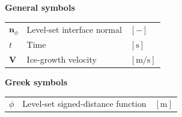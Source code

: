 \documentclass[letterpaper,times]{sae}
\begin{document}
\textbf{General symbols}

\begin{table}[h]
\centering
\begin{tabular}{L{0.08\textwidth} L{0.29\textwidth} L{0.08\textwidth}}
$\boldsymbol{n}_{\phi}$ & Level-set interface normal & $[-]$ \\
$t$                      & Time                       & $[\mathrm{s}]$ \\
$\boldsymbol{V}$         & Ice-growth velocity        & $[\mathrm{m/s}]$ \\
\end{tabular}
\end{table}

\textbf{Greek symbols}

\begin{table}[h]
\centering
\begin{tabular}{L{0.08\textwidth} L{0.29\textwidth} L{0.08\textwidth}}
$\phi$ & Level-set signed-distance function & $[\mathrm{m}]$ \\
\end{tabular}
\end{table}
\end{document}
